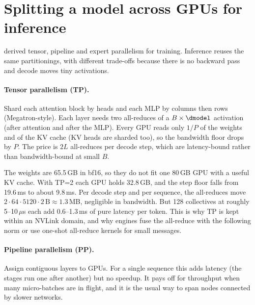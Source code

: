 \section{Splitting a model across GPUs for inference}\label{sec:efficient:parallel}

 derived tensor, pipeline and expert parallelism for training.
Inference reuses the same partitionings, with different trade-offs because there is no
backward pass and decode moves tiny activations.

\paragraph{Tensor parallelism (TP).} Shard each attention block by heads and each MLP by
columns then rows (Megatron-style). Each layer needs two all-reduces of a
$B\times\dmodel$ activation (after attention and after the MLP). Every GPU reads only
$1/P$ of the weights and of the KV cache (KV heads are sharded too), so the bandwidth
floor drops by $P$. The price is $2L$ all-reduces per decode step, which are
latency-bound rather than bandwidth-bound at small $B$.

\begin{napkinmath}[Qwen3-32B with TP=2 on NVLink]
The weights are 65.5\,GB in bf16, so they do not fit one 80\,GB GPU with a useful KV
cache. With TP=2 each GPU holds 32.8\,GB, and the step floor falls from 19.6\,ms to
about 9.8\,ms. Per decode step and per sequence, the all-reduces move
$2\cdot 64 \cdot 5120 \cdot 2\,\text{B} \approx 1.3$\,MB, negligible in bandwidth. But
128 collectives at roughly 5--10\,$\mu$s each add 0.6--1.3\,ms of pure latency per
token. This is why TP is kept within an NVLink domain, and why engines fuse the
all-reduce with the following norm or use one-shot all-reduce kernels for small
messages.
\end{napkinmath}

\paragraph{Pipeline parallelism (PP).} Assign contiguous layers to GPUs. For a single
sequence this adds latency (the stages run one after another) but no speedup. It pays
off for throughput when many micro-batches are in flight, and it is the usual way to
span nodes connected by slower networks.

